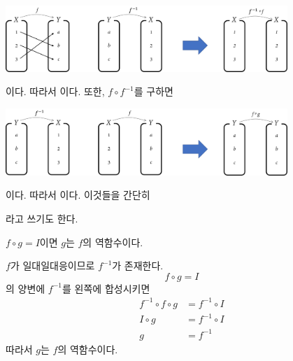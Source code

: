 \documentclass{oblivoir}
\begin{document}
%
\label{inverse12}
\vspace{-20pt}
\begin{center}
\includegraphics[width=0.8\textwidth]{inverse_12-1}
\end{center}
이다.
따라서
이다.
또한, \(f\circ f^{-1}\)를 구하면
\begin{center}
\includegraphics[width=0.8\textwidth]{inverse_12-2}
\end{center}
이다.
따라서
이다.
이것들을 간단히
\begin{center}
\end{center}
라고 쓰기도 한다.

\newpage
%
\label{inverse13}
\begin{center}
\(f\circ g=I\)이면 \(g\)는 \(f\)의 역함수이다.
\end{center}
\begin{mdframed}
\(f\)가 일대일대응이므로 \(f^{-1}\)가 존재한다.
\[f\circ g=I\]의 양변에 \(f^{-1}\)를 왼쪽에 합성시키면\footnotemark
\begin{align*}
f^{-1}\circ f\circ g&=f^{-1}\circ I\\
I\circ g&=f^{-1}\circ I\\
g&=f^{-1}
\end{align*}
따라서 \(g\)는 \(f\)의 역함수이다.
\end{mdframed}
\end{document}
